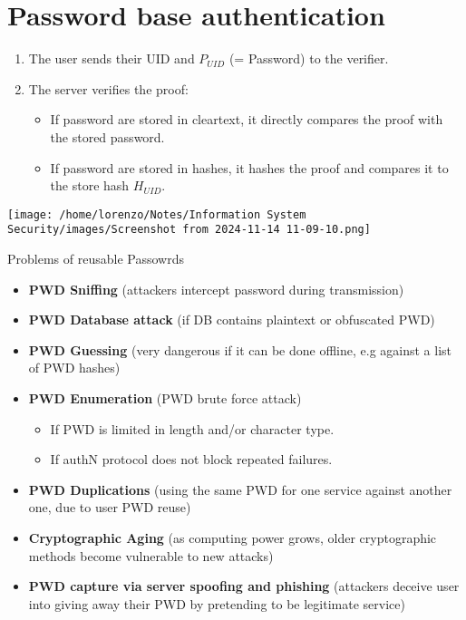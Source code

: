 \section{Password base authentication}
\begin{minipage}{0.5\textwidth}
    \begin{enumerate}
        \item The user sends their UID and \(P_{UID}\) (= Password) to the verifier.
        \item The server verifies the proof:
        \begin{itemize}
            \item If password are stored in cleartext, it directly compares the proof with the stored password.
            \item If password are stored in hashes, it hashes the proof and compares it to the store hash \(H_{UID}\).
        \end{itemize}
    \end{enumerate}
\end{minipage} 
\hspace{1cm}
\begin{minipage}{0.5\textwidth}
    \centering
    \texttt{[image: /home/lorenzo/Notes/Information System Security/images/Screenshot from 2024-11-14 11-09-10.png]}
\end{minipage}

\begin{quotebox-yellow}{Problems of reusable Passowrds}
    \begin{itemize}
        \item \textbf{PWD Sniffing} (attackers intercept password during transmission)
        \item \textbf{PWD Database attack} (if DB contains plaintext or obfuscated PWD)
        \item \textbf{PWD Guessing} (very dangerous if it can be done offline, e.g against a list of PWD hashes)
        \item \textbf{PWD Enumeration} (PWD brute force attack)
        \begin{itemize}
            \item If PWD is limited in length and/or character type.
            \item If authN protocol does not block repeated failures.
        \end{itemize}
        \item \textbf{PWD Duplications} (using the same PWD for one service against another one, due to user PWD reuse)
        \item \textbf{Cryptographic Aging} (as computing power grows, older cryptographic methods become vulnerable to new attacks)
        \item \textbf{PWD capture via server spoofing and phishing} (attackers deceive user into giving away their PWD by pretending to be legitimate service)
    \end{itemize} 
\end{quotebox-yellow}



